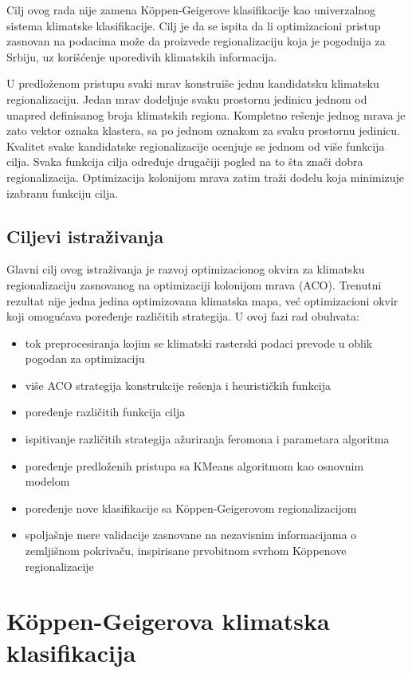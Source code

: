 \documentclass[11pt]{article}
\begin{document}
Cilj ovog rada nije zamena Köppen-Geigerove klasifikacije kao univerzalnog sistema klimatske klasifikacije. Cilj je da se ispita da li optimizacioni pristup zasnovan na podacima može da proizvede regionalizaciju koja je pogodnija za Srbiju, uz korišćenje uporedivih klimatskih informacija.

U predloženom pristupu svaki mrav konstruiše jednu kandidatsku klimatsku regionalizaciju. Jedan mrav dodeljuje svaku prostornu jedinicu jednom od unapred definisanog broja klimatskih regiona. Kompletno rešenje jednog mrava je zato vektor oznaka klastera, sa po jednom oznakom za svaku prostornu jedinicu. Kvalitet svake kandidatske regionalizacije ocenjuje se jednom od više funkcija cilja. Svaka funkcija cilja određuje drugačiji pogled na to šta znači dobra regionalizacija. Optimizacija kolonijom mrava zatim traži dodelu koja minimizuje izabranu funkciju cilja.

\subsection{Ciljevi istraživanja}
Glavni cilj ovog istraživanja je razvoj optimizacionog okvira za klimatsku regionalizaciju zasnovanog na optimizaciji kolonijom mrava (ACO).
Trenutni rezultat nije jedna jedina optimizovana klimatska mapa, već optimizacioni okvir koji omogućava poređenje različitih strategija. U ovoj fazi rad obuhvata:

\begin{itemize}
    \item tok preprocesiranja kojim se klimatski rasterski podaci prevode u oblik pogodan za optimizaciju
    \item više ACO strategija konstrukcije rešenja i heurističkih funkcija
    \item poređenje različitih funkcija cilja
    \item ispitivanje različitih strategija ažuriranja feromona i parametara algoritma
    \item poređenje predloženih pristupa sa KMeans algoritmom kao osnovnim modelom
    \item poređenje nove klasifikacije sa Köppen-Geigerovom regionalizacijom
    \item spoljašnje mere validacije zasnovane na nezavisnim informacijama o zemljišnom pokrivaču, inspirisane prvobitnom svrhom Köppenove regionalizacije
\end{itemize}

\section{Köppen-Geigerova klimatska klasifikacija}
\label{sec:koppen}
\end{document}
